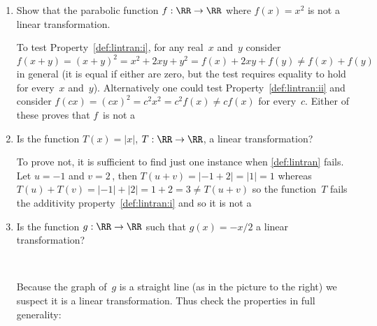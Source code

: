 \begin{example}[1D cases] 
\begin{enumerate}
\item Show that the parabolic function \(f:\RR\to\RR\) where \(f(x)=x^2\) is not a linear transformation.
\begin{solution} 
To test Property~\ref{def:lintran:i},  for any real~\(x\) and~\(y\) consider \(f(x+y)=(x+y)^2=x^2+2xy+y^2=f(x)+2xy+f(y)\neq f(x)+f(y)\) in general (it is equal if either are zero, but the test requires equality to hold for every~\(x\) and~\(y\)).  
Alternatively one could test Property~\ref{def:lintran:ii} and consider \(f(cx)=(cx)^2=c^2x^2=c^2f(x)\neq cf(x)\) for every~\(c\).
Either of these proves that \(f\)~is not a 
\end{solution}

\item 
\begin{figbox}{}%
Is the function \(T(x)=|x|\), \(T:\RR\to\RR\), a linear transformation? 
\vspace{2.5\baselineskip}
\end{figbox}

\begin{solution} 
To prove not, it is sufficient to find just one instance when \cref{def:lintran} fails. 
Let \(u=-1\) and \(v=2\)\,, then \(T(u+v)=|-1+2|=|1|=1\) whereas \(T(u)+T(v)=|-1|+|2|=1+2=3\neq T(u+v)\) so the function~\(T\) fails the additivity property~\cref{def:lintran:i} and so it is not a 
\end{solution}



\item 
Is the function \(g:\RR\to\RR\) such that \(g(x)=-x/2\) a linear transformation?

\begin{solution} \ \\
\begin{figbox}{}%
Because the graph of~\(g\) is a straight line (as in the picture to the right) we suspect it is a linear transformation.
Thus check the properties in full generality:
\vspace{1\baselineskip}


\end{figbox}
\end{solution}
\end{enumerate}
\end{example}
